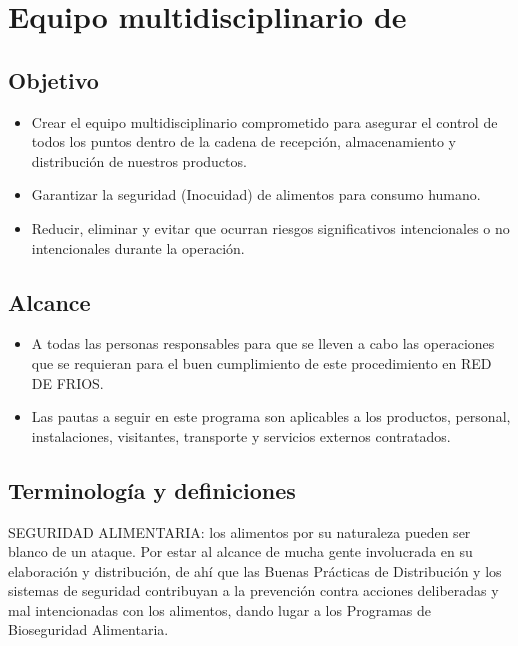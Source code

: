 \thispagestyle{formato-PI}
\renewcommand{\MayorVer}{2}
\renewcommand{\MenorVer}{0}
\renewcommand{\Codigo}{FD-1-MAN}
\renewcommand{\FechaPub}{2023--01}
\renewcommand{\Titulo}{Equipo multidisciplinario de \textit{}}

\section{\Titulo} \label{ESP:EquipoFoodDefense}

\subsection{Objetivo}
\begin{itemize}
	\item Crear el equipo multidisciplinario comprometido para asegurar el control de todos los puntos dentro de la cadena de recepción, almacenamiento y distribución de nuestros productos.
	\item Garantizar la seguridad (Inocuidad) de alimentos para consumo humano.
	\item Reducir, eliminar y evitar que ocurran riesgos significativos intencionales o no intencionales durante la operación.
\end{itemize}

\subsection{Alcance}
\begin{itemize}
	\item A todas las personas responsables para que se lleven a cabo las operaciones que se requieran para el buen cumplimiento de este procedimiento en RED DE FRIOS.
	\item Las pautas a seguir en este programa son aplicables a los productos, personal, instalaciones, visitantes, transporte y servicios externos contratados.
\end{itemize}

\subsection{Terminología y definiciones} %

SEGURIDAD ALIMENTARIA: los alimentos por su naturaleza pueden ser blanco de un ataque. Por estar al alcance de mucha gente involucrada en su elaboración y distribución, de ahí que las Buenas Prácticas de Distribución y los sistemas de seguridad contribuyan a la prevención contra acciones deliberadas y mal intencionadas con los alimentos, dando lugar a los Programas de Bioseguridad Alimentaria.

